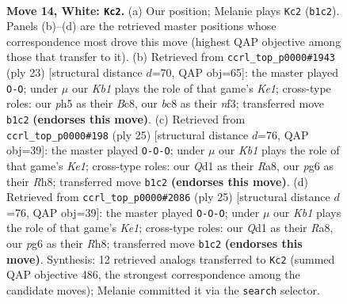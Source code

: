 \documentclass[11pt]{article}
\begin{document}
\clearpage

\begin{figure}[p]\centering
\begin{subfigure}{0.46\textwidth}\centering
\resizebox{\linewidth}{!}{%
\newchessgame
\chessboard[
  setfen={r1b1k2r/2p1qp2/2n2np1/p2p3p/1p1P4/5NPP/PP2PP2/RK1QBB1R w kq - 0 14},
  showmover=false,
  pgfstyle=straightmove, color=movearrow, markmove={b1-c2}
]}
\caption{}
\end{subfigure}\hfill
\begin{subfigure}{0.46\textwidth}\centering
\resizebox{\linewidth}{!}{%
\newchessgame
\chessboard[
  setfen={r1bqk2r/2p1npb1/p5pp/1p1pP3/3P4/2N2N2/PPB2PPP/R2QK2R b KQkq - 0 12},
  showmover=false,
  pgfstyle=straightmove, color=movearrow, markmove={e8-g8}
]}
\caption{}
\end{subfigure}
\\[4pt]
\begin{subfigure}{0.46\textwidth}\centering
\resizebox{\linewidth}{!}{%
\newchessgame
\chessboard[
  setfen={r3k2r/3bbp1p/pqnppp2/1p3P2/4P3/2N2N2/PPPQ2PP/1K1R1B1R b kq - 2 13},
  showmover=false,
  pgfstyle=straightmove, color=movearrow, markmove={e8-c8}
]}
\caption{}
\end{subfigure}\hfill
\begin{subfigure}{0.46\textwidth}\centering
\resizebox{\linewidth}{!}{%
\newchessgame
\chessboard[
  setfen={r3k2r/3bbp1p/pqnppp2/1p3P2/4P3/2N2N2/PPPQ2PP/1K1R1B1R b kq - 2 13},
  showmover=false,
  pgfstyle=straightmove, color=movearrow, markmove={e8-c8}
]}
\caption{}
\end{subfigure}
\caption{\textbf{Move 14, White: \texttt{Kc2}.} (a) Our position; Melanie plays \texttt{Kc2} (\texttt{b1c2}). Panels (b)--(d) are the retrieved master positions whose correspondence most drove this move (highest QAP objective among those that transfer to it). (b) Retrieved from \texttt{ccrl\_top\_p0000\#1943} (ply 23) [structural distance $d$=70, QAP obj=65]: the master played \texttt{O-O}; under $\mu$ our \emph{Kb1} plays the role of that game's \emph{Ke1}; cross-type roles: our \emph{p}h5 as their \emph{B}c8, our \emph{b}c8 as their \emph{n}f3; transferred move \texttt{b1c2} \textbf{(endorses this move)}. (c) Retrieved from \texttt{ccrl\_top\_p0000\#198} (ply 25) [structural distance $d$=76, QAP obj=39]: the master played \texttt{O-O-O}; under $\mu$ our \emph{Kb1} plays the role of that game's \emph{Ke1}; cross-type roles: our \emph{Q}d1 as their \emph{R}a8, our \emph{p}g6 as their \emph{R}h8; transferred move \texttt{b1c2} \textbf{(endorses this move)}. (d) Retrieved from \texttt{ccrl\_top\_p0000\#2086} (ply 25) [structural distance $d$=76, QAP obj=39]: the master played \texttt{O-O-O}; under $\mu$ our \emph{Kb1} plays the role of that game's \emph{Ke1}; cross-type roles: our \emph{Q}d1 as their \emph{R}a8, our \emph{p}g6 as their \emph{R}h8; transferred move \texttt{b1c2} \textbf{(endorses this move)}. Synthesis: 12 retrieved analogs transferred to \texttt{Kc2} (summed QAP objective 486, the strongest correspondence among the candidate moves); Melanie committed it via the \texttt{search} selector.}
\label{fig:thought-m26}
\end{figure}
\end{document}
